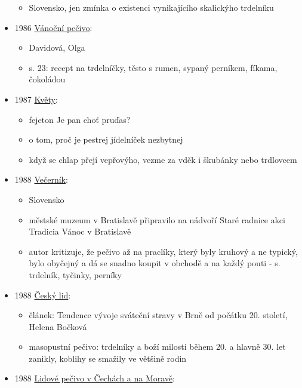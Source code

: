\begin{itemize}
  \begin{itemize}
  \tightlist
  \item
    Slovensko, jen zmínka o existenci vynikajícího skalickýho trdelníku
  \end{itemize}
\item
  1986
  \href{https://ceskadigitalniknihovna.cz/uuid/uuid:9e7ab0f0-3a6b-11e4-8e0d-005056827e51}{Vánoční
  pečivo}:

  \begin{itemize}
  \tightlist
  \item
    Davidová, Olga
  \item
    s. 23: recept na trdelníčky, těsto s rumen, sypaný perníkem, fíkama,
    čokoládou
  \end{itemize}
\item
  1987
  \href{https://ceskadigitalniknihovna.cz/uuid/uuid:fb80fd90-a376-11e3-aa54-5ef3fc9bb22f}{Květy}:

  \begin{itemize}
  \tightlist
  \item
    fejeton Je pan choť pruďas?
  \item
    o tom, proč je pestrej jídelníček nezbytnej
  \item
    když se chlap přejí vepřovýho, vezme za vděk i škubánky nebo
    trdlovcem
  \end{itemize}
\item
  1988
  \href{https://dikda.snk.sk/uuid/uuid:f1160e6b-b724-4a15-ba1e-ad92b54d2423}{Večerník}:

  \begin{itemize}
  \tightlist
  \item
    Slovensko
  \item
    městské muzeum v Bratislavě připravilo na nádvoří Staré radnice akci
    Tradicia Vánoc v Bratislavě
  \item
    autor kritizuje, že pečivo až na praclíky, který byly kruhový a ne
    typický, bylo obyčejný a dá se snadno koupit v obchodě a na každý
    pouti - s. trdelník, tyčinky, perníky
  \end{itemize}
\item
  1988
  \href{https://ceskadigitalniknihovna.cz/uuid/uuid:d410e1e0-4611-11e1-1331-001143e3f55c}{Český
  lid}:

  \begin{itemize}
  \tightlist
  \item
    článek: Tendence vývoje sváteční stravy v Brně od počátku 20.
    století, Helena Bočková
  \item
    masopustní pečivo: trdelníky a boží milosti během 20. a hlavně 30.
    let zanikly, koblihy se smažily ve většině rodin
  \end{itemize}
\item
  1988
  \href{https://ceskadigitalniknihovna.cz/uuid/uuid:0a416360-305d-11e9-844c-005056827e51}{Lidové
  pečivo v Čechách a na Moravě}:


\end{itemize}

